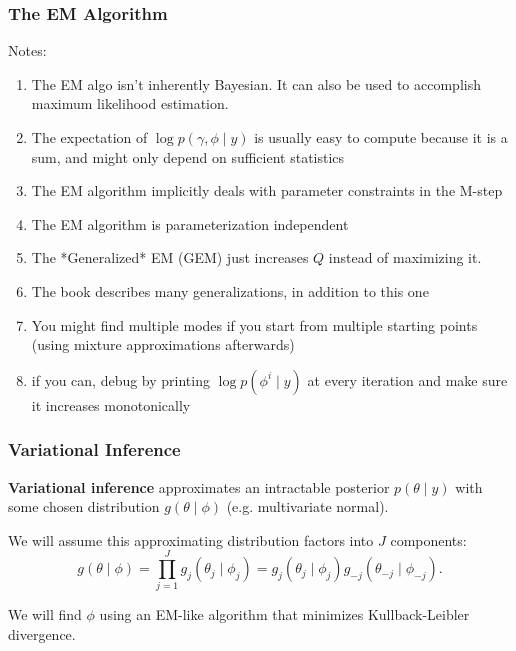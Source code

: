 \documentclass{beamer}
\begin{document}
\begin{frame}[fragile]
\frametitle{The EM Algorithm}

Notes:
\begin{enumerate}
\item The EM algo isn't inherently Bayesian. It can also be used to accomplish maximum likelihood estimation.
\item The expectation of $\log p(\gamma, \phi \mid y)$ is usually easy to compute because it is a sum, and might only depend on sufficient statistics
\item The EM algorithm implicitly deals with parameter constraints in the M-step
\item The EM algorithm is parameterization independent
\item The *Generalized* EM (GEM) just increases $Q$ instead of maximizing it.
\item The book describes many generalizations, in addition to this one
\item You might find multiple modes if you start from multiple starting points (using mixture approximations afterwards)
\item if you can, debug by printing $\log p(\phi^i \mid y)$ at every iteration and make sure it increases monotonically
\end{enumerate}

\end{frame}


\begin{frame}[fragile]
\frametitle{Variational Inference}

{\bf Variational inference} approximates an intractable posterior $p(\theta \mid y)$ with some chosen distribution $g(\theta \mid \phi)$ (e.g. multivariate normal).
\newline
\pause

We will assume this approximating distribution factors into $J$ components:
$$
g(\theta \mid \phi) = \prod_{j=1}^J g_j(\theta_j \mid \phi_j) = g_j(\theta_j \mid \phi_j)g_{-j}(\theta_{-j} \mid \phi_{-j}).
$$


We will find $\phi$ using an EM-like algorithm that minimizes Kullback-Leibler divergence.

\end{frame}
\end{document}
